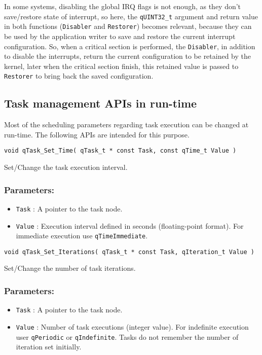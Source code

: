 In some systems, disabling the global IRQ flags is not enough, as they don't save/restore state of interrupt, so here, the \lstinline{qUINT32_t} argument and return value in both functions (\lstinline{Disabler} and \lstinline{Restorer}) becomes relevant, because they can be used by the application writer to save and restore the current interrupt configuration. So, when a critical section is performed, the \lstinline{Disabler}, in addition to disable the interrupts, return the current configuration to be retained by the kernel, later when the critical section finish, this retained value is passed to \lstinline{Restorer} to bring back the saved configuration. 

\subsection{Task management APIs in run-time }
Most of the scheduling parameters regarding task execution can be changed at run-time. The following APIs are intended for this purpose. 
\medskip


\begin{lstlisting}[style=CStyle]
void qTask_Set_Time( qTask_t * const Task, const qTime_t Value )
\end{lstlisting}

Set/Change the task execution interval. 

\subsubsection*{Parameters:}
\begin{itemize}
    \item \lstinline{Task} : A pointer to the task node.
    \item \lstinline{Value} : Execution interval defined in seconds (floating-point format). For immediate execution use \lstinline{qTimeImmediate}.
\end{itemize}

\noindent\hrulefill

\begin{lstlisting}[style=CStyle]
void qTask_Set_Iterations( qTask_t * const Task, qIteration_t Value )
\end{lstlisting}

Set/Change the number of task iterations. 

\subsubsection*{Parameters:}
\begin{itemize}
    \item \lstinline{Task} : A pointer to the task node.
    \item \lstinline{Value} : Number of task executions (integer value). For indefinite execution user \lstinline{qPeriodic} or \lstinline{qIndefinite}. Tasks do not remember the number of iteration set initially. 
\end{itemize}

